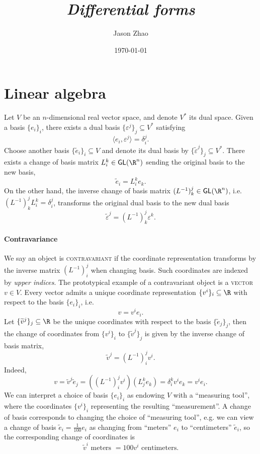 \documentclass[reqno]{amsart}
\title
{
	\emph{Differential forms}
}
\author{Jason Zhao}
\date{\today}
\theoremstyle{definition}
\theoremstyle{remark}
\renewcommand{\epsilon}{\varepsilon}
\renewcommand{\emph}{\textsc}
\begin{document}
\maketitle
\tableofcontents

\section{Linear algebra}

Let $V$ be an $n$-dimensional real vector space, and denote $V^*$ its dual space. Given a basis $\{e_i\}_i$, there exists a dual basis $\{\epsilon^j\}_j \subseteq V^*$ satisfying 
	\[ \langle e_i, \epsilon^j \rangle = \delta^j_i. \]
Choose another basis $\{\widetilde e_i\}_i \subseteq V$ and denote its dual basis by $\{\widetilde \epsilon^j\}_j \subseteq V^*$. There exists a change of basis matrix $L^k_i \in \mathsf{GL} (\R^n)$ sending the original basis to the new basis,
	\[ \widetilde e_i = L^k_i e_k. \]	
On the other hand, the inverse change of basis matrix $(L^{-1})^j_k \in \mathsf{GL} (\R^n)$, i.e. $(L^{-1})^j_k L^k_i = \delta^j_i$, transforms the original dual basis to the new dual basis 	
	\[ \widetilde \epsilon^j = (L^{-1})^j_k \epsilon^k. \]

\paragraph*{\textbf{Contravariance}}

We say an object is \emph{contravariant} if the coordinate representation transforms by the inverse matrix $(L^{-1})^j_i$ when changing basis. Such coordinates are indexed by \textit{upper indices}. The prototypical example of a contravariant object is a \emph{vector} $v \in V$. Every vector admits a unique coordinate representation $\{v^i\}_i \subseteq \R$ with respect to the basis $\{e_i\}_i$, i.e.
	\[ v = v^i e_i . \]
Let $\{ \widetilde v^j \}_j \subseteq \R$ be the unique coordinates with respect to the basis $\{\widetilde e_j\}_j$, then the change of coordinates from $\{v^i\}_i$ to $\{\widetilde v^j\}_j$ is given by the inverse change of basis matrix,
	\[ \widetilde v^j = {(L^{-1})}^j_i v^i. \]
Indeed, 	
	\[ v = \widetilde v^j \widetilde e_j  = \left( {(L^{-1})}^j_i v^i \right) \left( L^k_j e_k \right) = \delta^k_i v^i e_k = v^i e_i . \]
We can interpret a choice of basis $\{e_i\}_i$ as endowing $V$ with a ``measuring tool'', where the coordinates $\{v^i\}_i$ representing the resulting ``measurement''. A change of basis corresponds to changing the choice of ``measuring tool'', e.g. we can view a change of basis $\widetilde e_i = \tfrac{1}{100} e_i$ as changing from ``meters'' $e_i$ to ``centimeters'' $\widetilde e_i$, so the corresponding change of coordinates is 
	\[ \widetilde v^i \text{ meters } = 100 v^i \text{ centimeters}. \]
\end{document}
